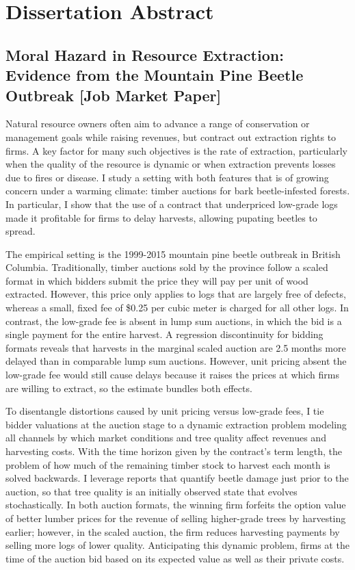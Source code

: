 \documentclass[11pt,letterpaper]{article}
\begin{document}
\section*{Dissertation Abstract}

\subsection*{Moral Hazard in Resource Extraction: Evidence from the Mountain Pine Beetle Outbreak [Job Market Paper]}

Natural resource owners often aim to advance a range of conservation or management goals while raising revenues, but contract out extraction rights to firms. A key factor for many such objectives is the rate of extraction, particularly when the quality of the resource is dynamic or when extraction prevents losses due to fires or disease. I study a setting with both features that is of growing concern under a warming climate: timber auctions for bark beetle-infested forests. In particular, I show that the use of a contract that underpriced low-grade logs made it profitable for firms to delay harvests, allowing pupating beetles to spread.

The empirical setting is the 1999-2015 mountain pine beetle outbreak in British Columbia. Traditionally, timber auctions sold by the province follow a scaled format in which bidders submit the price they will pay per unit of wood extracted. However, this price only applies to logs that are largely free of defects, whereas a small, fixed fee of \$0.25 per cubic meter is charged for all other logs. In contrast, the low-grade fee is absent in lump sum auctions, in which the bid is a single payment for the entire harvest. A regression discontinuity for bidding formats reveals that harvests in the marginal scaled auction are 2.5 months more delayed than in comparable lump sum auctions. However, unit pricing absent the low-grade fee would still cause delays because it raises the prices at which firms are willing to extract, so the estimate bundles both effects.

\newpage

To disentangle distortions caused by unit pricing versus low-grade fees, I tie bidder valuations at the auction stage to a dynamic extraction problem modeling all channels by which market conditions and tree quality affect revenues and harvesting costs. With the time horizon given by the contract's term length, the problem of how much of the remaining timber stock to harvest each month is solved backwards. I leverage reports that quantify beetle damage just prior to the auction, so that tree quality is an initially observed state that evolves stochastically. In both auction formats, the winning firm forfeits the option value of better lumber prices for the revenue of selling higher-grade trees by harvesting earlier; however, in the scaled auction, the firm reduces harvesting payments by selling more logs of lower quality. Anticipating this dynamic problem, firms at the time of the auction bid based on its expected value as well as their private costs.
\end{document}
